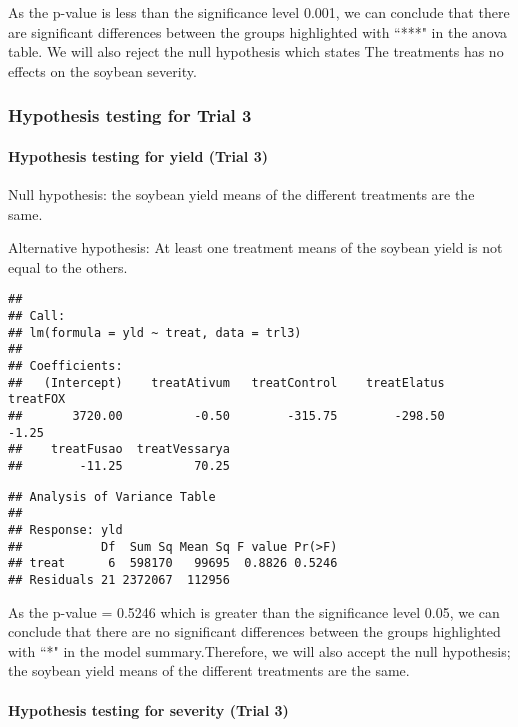 \documentclass[
]{article}
\begin{document}
As the p-value is less than the significance level 0.001, we can
conclude that there are significant differences between the groups
highlighted with ``***" in the anova table. We will also reject the null
hypothesis which states The treatments has no effects on the soybean
severity.

\hypertarget{hypothesis-testing-for-trial-3}{%
\subsubsection{Hypothesis testing for Trial
3}\label{hypothesis-testing-for-trial-3}}

\hypertarget{hypothesis-testing-for-yield-trial-3}{%
\paragraph{Hypothesis testing for yield (Trial
3)}\label{hypothesis-testing-for-yield-trial-3}}

Null hypothesis: the soybean yield means of the different treatments are
the same.

Alternative hypothesis: At least one treatment means of the soybean
yield is not equal to the others.

\begin{verbatim}
## 
## Call:
## lm(formula = yld ~ treat, data = trl3)
## 
## Coefficients:
##   (Intercept)    treatAtivum   treatControl    treatElatus       treatFOX  
##       3720.00          -0.50        -315.75        -298.50          -1.25  
##    treatFusao  treatVessarya  
##        -11.25          70.25
\end{verbatim}

\begin{verbatim}
## Analysis of Variance Table
## 
## Response: yld
##           Df  Sum Sq Mean Sq F value Pr(>F)
## treat      6  598170   99695  0.8826 0.5246
## Residuals 21 2372067  112956
\end{verbatim}

As the p-value = 0.5246 which is greater than the significance level
0.05, we can conclude that there are no significant differences between
the groups highlighted with ``*" in the model summary.Therefore, we will
also accept the null hypothesis; the soybean yield means of the
different treatments are the same.

\hypertarget{hypothesis-testing-for-severity-trial-3}{%
\paragraph{Hypothesis testing for severity (Trial
3)}\label{hypothesis-testing-for-severity-trial-3}}
\end{document}
